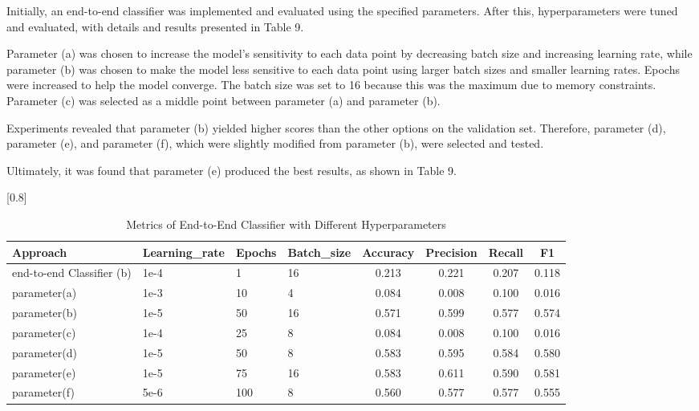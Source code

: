 \documentclass[a4paper,11pt]{article}
\begin{document}
Initially, an end-to-end classifier was implemented and evaluated using the specified parameters.
After this, hyperparameters were tuned and evaluated, with details and results presented in Table 9.

Parameter (a) was chosen to increase the model's sensitivity to each data point by decreasing batch size and increasing learning rate,
while parameter (b) was chosen to make the model less sensitive to each data point using larger batch sizes and smaller learning rates.
Epochs were increased to help the model converge.
The batch size was set to 16 because this was the maximum due to memory constraints.
Parameter (c) was selected as a middle point between parameter (a) and parameter (b).

Experiments revealed that parameter (b) yielded higher scores than the other options on the validation set.
Therefore, parameter (d), parameter (e), and parameter (f), which were slightly modified from parameter (b), were selected and tested.

Ultimately, it was found that parameter (e) produced the best results, as shown in Table 9.

\begin{table}[htbp]
    \centering
    \caption{Metrics of End-to-End Classifier with Different Hyperparameters}
    \small
    \scalebox{0.8}[0.8]{
    \begin{tabular}{l|lll|cccc}
         Approach & Learning\_rate & Epochs & Batch\_size & Accuracy & Precision & Recall & F1 \\ \hline \hline
         end-to-end Classifier (b) & 1e-4& 1 & 16 & 0.213 & 0.221 &0.207 & 0.118 \\ \hline
         parameter(a)                  & 1e-3& 10& 4  & 0.084 & 0.008 & 0.100 & 0.016 \\
         parameter(b)                  & 1e-5& 50& 16 & 0.571 & 0.599 & 0.577 & 0.574 \\
         parameter(c)                  & 1e-4& 25& 8  & 0.084 & 0.008 & 0.100 & 0.016 \\ \hline
         parameter(d)                  & 1e-5& 50& 8  & 0.583 & 0.595 & 0.584 & 0.580 \\
         \rowcolor[rgb]{0.9,0.9,0}parameter(e)                  & 1e-5& 75& 16 & 0.583 & 0.611 & 0.590 & 0.581 \\
         parameter(f)                  & 5e-6& 100& 8 & 0.560 & 0.577 & 0.577 & 0.555 \\


    \end{tabular}

    }
\end{table}
\end{document}

